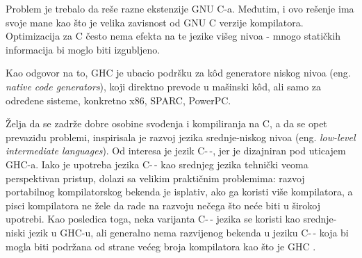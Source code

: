 Problem je trebalo da reše razne ekstenzije GNU C-a. Međutim, i ovo rešenje ima svoje mane kao što je velika zavisnost od GNU C verzije kompilatora. Optimizacija za C često nema efekta na te jezike višeg nivoa - mnogo statičkih informacija bi moglo biti izgubljeno. 

Kao odgovor na to, GHC je ubacio podršku za k\^{o}d generatore niskog nivoa (eng. \emph{native code generators}), koji direktno prevode u mašinski k\^{o}d, ali samo za određene sisteme, konkretno x86, SPARC, PowerPC.

Želja da se zadrže dobre osobine svođenja i kompiliranja na C, a da se opet prevaziđu problemi, inspirisala je razvoj jezika srednje-niskog nivoa (eng. \emph{low-level intermediate languages}). Od interesa je jezik C-\,-, jer je dizajniran pod uticajem GHC-a. Iako je upotreba jezika C-\,- kao srednjeg jezika tehnički veoma perspektivan pristup, dolazi sa velikim praktičnim problemima: razvoj portabilnog kompilatorskog bekenda je isplativ, ako ga koristi više kompilatora, a pisci kompilatora ne žele da rade na razvoju nečega što neće biti u širokoj upotrebi. Kao posledica toga, neka varijanta C-\,- jezika se koristi kao srednje-niski jezik u GHC-u, ali generalno nema razvijenog bekenda u jeziku C-\,- koja bi mogla biti podržana od strane većeg broja kompilatora kao što je GHC \cite{SPJ92}.

